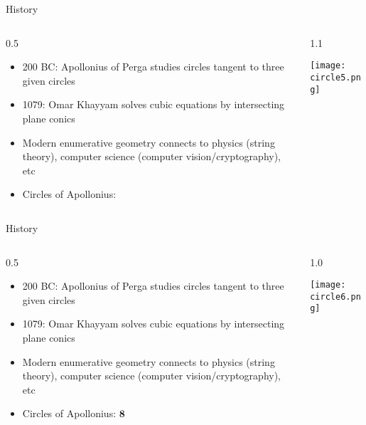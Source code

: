 \documentclass{beamer}
\theoremstyle{definition}
\begin{document}
                                        \begin{frame}{History}

      \begin{columns}[c]
        \begin{column}{0.5\hsize}
      
          \begin{itemize}
          \item {\texttildelow}200 BC: Apollonius of Perga studies circles tangent to three
            given circles
          \item {\texttildelow}1079: Omar Khayyam solves cubic equations by intersecting
            plane conics
          \item Modern enumerative geometry connects to physics (string theory),
            computer science (computer vision/cryptography), etc
            \item Circles of Apollonius:
          \end{itemize}
        \end{column}
        \begin{column}{1.1\hsize}

            \texttt{[image: circle5.png]}

        \end{column}
      \end{columns}
                                        \end{frame}

                                                \begin{frame}{History}

      \begin{columns}[c]
        \begin{column}{0.5\hsize}
      
          \begin{itemize}
          \item {\texttildelow}200 BC: Apollonius of Perga studies circles tangent to three
            given circles
          \item {\texttildelow}1079: Omar Khayyam solves cubic equations by intersecting
            plane conics
          \item Modern enumerative geometry connects to physics (string theory),
            computer science (computer vision/cryptography), etc
            \item Circles of Apollonius: $\mathbf{8}$
          \end{itemize}
        \end{column}
        \begin{column}{1.0\hsize}

            \texttt{[image: circle6.png]}

        \end{column}
      \end{columns}
                                                \end{frame}
\end{document}
